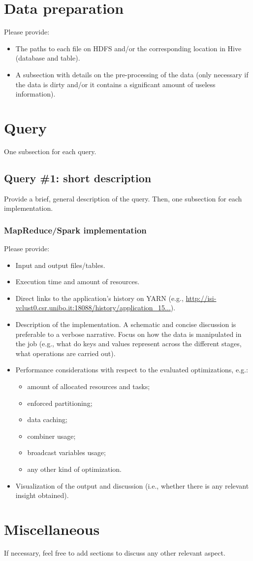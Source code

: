 \documentclass[10pt]{article}
\begin{document}
\section{Data preparation}

Please provide:
\begin{itemize}
\item The paths to each file on HDFS and/or the corresponding location in Hive (database and table).
\item A subsection with details on the pre-processing of the data (only necessary if the data is dirty and/or it contains a significant amount of useless information).
\end{itemize}


\section{Query}

One subsection for each query.

\subsection{Query \#1: short description}

Provide a brief, general description of the query. Then, one subsection for each implementation.

\subsubsection{MapReduce/Spark implementation}

Please provide:
\begin{itemize}
\item Input and output files/tables.
\item Execution time and amount of resources.
\item Direct links to the application's history on YARN (e.g., \url{http://isi-vclust0.csr.unibo.it:18088/history/application_15...}).
\item Description of the implementation. A schematic and concise discussion is preferable to a verbose narrative. Focus on how the data is manipulated in the job (e.g., what do keys and values represent across the different stages, what operations are carried out). 
\item Performance considerations with respect to the evaluated optimizations, e.g.:
\begin{itemize}
\item amount of allocated resources and tasks;
\item enforced partitioning;
\item data caching;
\item combiner usage;
\item broadcast variables usage;
\item any other kind of optimization.
\end{itemize}
\item Visualization of the output and discussion (i.e., whether there is any relevant insight obtained).
\end{itemize}

\section{Miscellaneous}

If necessary, feel free to add sections to discuss any other relevant aspect.
\end{document}
